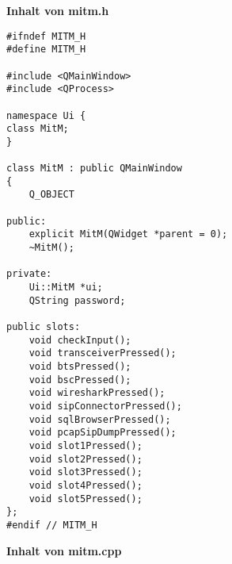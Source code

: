 \vspace{2cm}
\textbf{Inhalt von mitm.h}



\begin{lstlisting}
#ifndef MITM_H
#define MITM_H

#include <QMainWindow>
#include <QProcess>

namespace Ui {
class MitM;
}

class MitM : public QMainWindow
{
    Q_OBJECT

public:
    explicit MitM(QWidget *parent = 0);
    ~MitM();

private:
    Ui::MitM *ui;
    QString password;

public slots:
    void checkInput();
    void transceiverPressed();
    void btsPressed();
    void bscPressed();
    void wiresharkPressed();
    void sipConnectorPressed();
    void sqlBrowserPressed();
    void pcapSipDumpPressed();
    void slot1Pressed();
    void slot2Pressed();
    void slot3Pressed();
    void slot4Pressed();
    void slot5Pressed();
};
#endif // MITM_H
\end{lstlisting}



\vspace{2cm}
\textbf{Inhalt von mitm.cpp}

